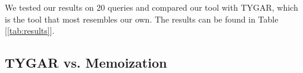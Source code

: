 \documentclass[acmsmall,nonacm]{acmart}
\begin{document}
\begin{table*}
\begin{tabular}{c c c | c | c }
    \bottomrule
  \end{tabular}
\end{table*}


We tested our results on 20 queries and compared our tool with TYGAR, 
which is the tool that most resembles our own. The results can be found in 
Table [\ref{tab:results}].



\subsection{TYGAR vs. Memoization}
\end{document}
